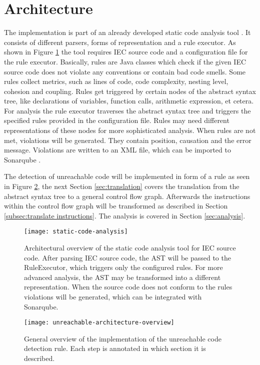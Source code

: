 \section{Architecture}
The implementation is part of an already developed static code analysis tool \cite{Prahofer_2012}. 
It consists of different parsers, forms of representation and a rule executor. 
As shown in Figure \ref{fig:general architecture} the tool requires IEC source code and a configuration file for the rule executor.
Basically, rules are Java classes which check if the given IEC source code does not violate any conventions or contain bad code smells. 
Some rules collect metrics, such as lines of code, code complexity, nesting level, cohesion and coupling.
Rules get triggered by certain nodes of the abstract syntax tree, like declarations of variables, function calls, arithmetic expression, et cetera.
For analysis the rule executor traverses the abstract syntax tree and triggers the specified rules provided in the configuration file.
Rules may need different representations of these nodes for more sophisticated analysis. 
When rules are not met, violations will be generated. They contain position, causation and the error message. Violations are written to an XML file, which can be imported to Sonarqube \cite{sonarqube}.


The detection of unreachable code will be implemented in form of a rule as seen in Figure \ref{fig:unreachable-architecture-overview}, the next Section \ref{sec:translation} covers the translation from the abstract syntax tree to a general control flow graph. 
Afterwards the instructions within the control flow graph will be transformed as described in Section \ref{subsec:translate instructions}.
The analysis is covered in Section \ref{sec:analysis}.
\pagebreak
\begin{figure}
	\centering
	\texttt{[image: static-code-analysis]}
	\caption{Architectural overview of the static code analysis tool for IEC source code. After parsing IEC source code, the AST will be passed to the RuleExecutor, which triggers only the configured rules. For more advanced analysis, the AST may be transformed into a different representation. When the source code does not conform to the rules violations will be generated, which can be integrated with Sonarqube.}
	\label{fig:general architecture}
\end{figure}

\begin{figure}
	\centering
	\texttt{[image: unreachable-architecture-overview]}
	\caption{General overview of the implementation of the unreachable code detection rule. Each step is annotated in which section it is described. }
	\label{fig:unreachable-architecture-overview}
\end{figure}

